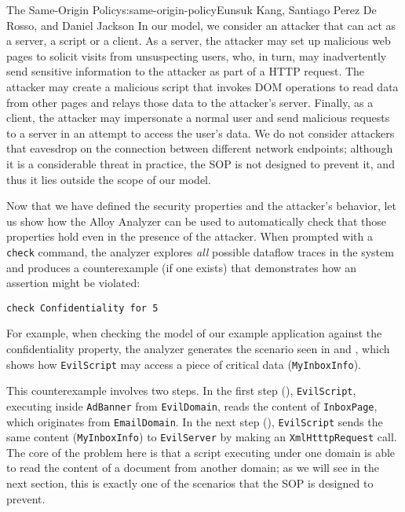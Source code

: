 \begin{aosachapter}{The Same-Origin Policy}{s:same-origin-policy}{Eunsuk Kang, Santiago Perez De Rosso, and Daniel Jackson}
In our model, we consider an attacker that can act as a server, a script
or a client. As a server, the attacker may set up malicious web pages to
solicit visits from unsuspecting users, who, in turn, may inadvertently
send sensitive information to the attacker as part of a HTTP request.
The attacker may create a malicious script that invokes DOM operations
to read data from other pages and relays those data to the attacker's
server. Finally, as a client, the attacker may impersonate a normal user
and send malicious requests to a server in an attempt to access the
user's data. We do not consider attackers that eavesdrop on the
connection between different network endpoints; although it is a
considerable threat in practice, the SOP is not designed to prevent it,
and thus it lies outside the scope of our model.

\label{checking-properties}

Now that we have defined the security properties and the attacker's
behavior, let us show how the Alloy Analyzer can be used to
automatically check that those properties hold even in the presence of
the attacker. When prompted with a \texttt{check} command, the analyzer
explores \emph{all} possible dataflow traces in the system and produces
a counterexample (if one exists) that demonstrates how an assertion
might be violated:

\begin{verbatim}
check Confidentiality for 5
\end{verbatim}

For example, when checking the model of our example application against
the confidentiality property, the analyzer generates the scenario seen
in  and
, which shows how
\texttt{EvilScript} may access a piece of critical data
(\texttt{MyInboxInfo}).


This counterexample involves two steps. In the first step
(),
\texttt{EvilScript}, executing inside \texttt{AdBanner} from
\texttt{EvilDomain}, reads the content of \texttt{InboxPage}, which
originates from \texttt{EmailDomain}. In the next step
(),
\texttt{EvilScript} sends the same content (\texttt{MyInboxInfo}) to
\texttt{EvilServer} by making an \texttt{XmlHtttpRequest} call. The core
of the problem here is that a script executing under one domain is able
to read the content of a document from another domain; as we will see in
the next section, this is exactly one of the scenarios that the SOP is
designed to prevent.


\end{aosachapter}
